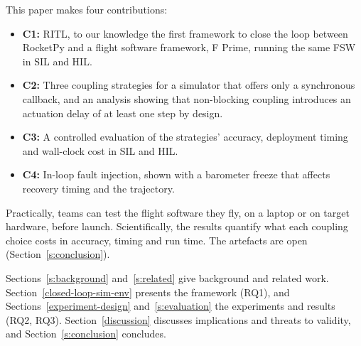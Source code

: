 This paper makes four contributions:
\begin{itemize}
\item \textbf{C1:} RITL, to our knowledge the first framework to close the loop between RocketPy and a flight software framework, F Prime, running the same FSW in SIL and HIL.
\item \textbf{C2:} Three coupling strategies for a simulator that offers only a synchronous callback, and an analysis showing that non-blocking coupling introduces an actuation delay of at least one step by design.
\item \textbf{C3:} A controlled evaluation of the strategies' accuracy, deployment timing and wall-clock cost in SIL and HIL.
\item \textbf{C4:} In-loop fault injection, shown with a barometer freeze that affects recovery timing and the trajectory.
\end{itemize}
Practically, teams can test the flight software they fly, on a laptop or on target hardware, before launch. Scientifically, the results quantify what each coupling choice costs in accuracy, timing and run time. The artefacts are open (Section~\ref{s:conclusion}).

Sections~\ref{s:background} and~\ref{s:related} give background and related work. Section~\ref{closed-loop-sim-env} presents the framework (RQ1), and Sections~\ref{experiment-design} and~\ref{s:evaluation} the experiments and results (RQ2, RQ3). Section~\ref{discussion} discusses implications and threats to validity, and Section~\ref{s:conclusion} concludes.
